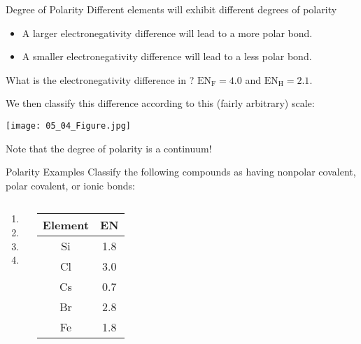 \documentclass[notes=show]{beamer}
\begin{document}
\begin{frame}[allowframebreaks]{Degree of Polarity}
	Different elements will exhibit different \alert{degrees of
	polarity}
	\begin{itemize}
		\item A \alert{larger} electronegativity
			difference will lead to a \alert{more
			polar} bond.
		\item A \alert{smaller} electronegativity
			difference will lead to a \alert{less
			polar} bond.
	\end{itemize}

	\bigskip

	\begin{example}
		What is the electronegativity difference in ?
		$\text{EN}_\text{F} = 4.0$ and $\text{EN}_\text{H} = 2.1$.
	\end{example}


	\framebreak

	We then classify this difference according to this (fairly arbitrary)
	scale:
	\begin{center}
		\texttt{[image: 05\_04\_Figure.jpg]}

		Note that the degree of polarity is a
		\alert{continuum}!
	\end{center}
\end{frame}

\begin{frame}[t]{Polarity Examples}
	Classify the following compounds as having nonpolar covalent, polar
	covalent, or ionic bonds:

	\begin{columns}
		\begin{enumerate}
			\item {}
			\item {}
			\item {}
			\item {}
		\end{enumerate}
		\centering
		\begin{tabular} {c S[table-format=1.1]}
			\textbf{Element} & \textbf{EN} \\ \midrule
			Si & 1.8 \\
			Cl & 3.0 \\
			Cs & 0.7 \\
			Br & 2.8 \\
			Fe & 1.8 \\
		\end{tabular}
	\end{columns}

\end{frame}
\end{document}
